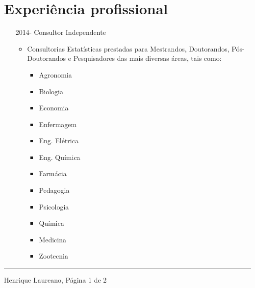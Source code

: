 \documentclass[12pt]{article}
\newcommand{\horrule}[1]{\noindent\rule{\linewidth}{#1}}
\begin{document}
\section*{Experi\^{e}ncia profissional}

\begin{itemize}
 \item[2014-] Consultor Independente
  \begin{itemize}
   \item Consultorias Estat\'{i}sticas prestadas para Mestrandos,
         Doutorandos, P\'{o}s-Doutorandos e Pesquisadores das mais diversas
         \'{a}reas, tais como:
    \begin{multicols}{4}
      \begin{itemize}
      \item Agronomia
      \item Biologia
      \item Economia
      \item Enfermagem
      \item Eng. El\'{e}trica
      \item Eng. Qu\'{i}mica
      \item Farm\'{a}cia
      \item Pedagogia
      \item Psicologia
      \item Qu\'{i}mica
      \item Medicina
      \item Zootecnia
     \end{itemize}
    \end{multicols}
  \end{itemize}
\end{itemize}

\vspace{\fill}
\horrule{1pt}
\noindent Henrique Laureano, \hfill P\'{a}gina 1 de 2
\end{document}
